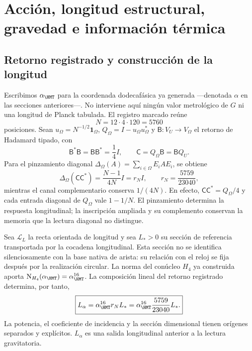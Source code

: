 \section{Acción, longitud estructural, gravedad e información térmica}
\label{v:ant:sec:gravity}

\subsection{Retorno registrado y construcción de la longitud}

Escribimos $\alpha_{\HMT}$ para la coordenada dodecafásica ya generada
---denotada $\alpha$ en las secciones anteriores---. No interviene aquí
ningún valor metrológico de $G$ ni una longitud de Planck tabulada. El
registro marcado reúne
\begin{equation}
 N=12\cdot4\cdot120=5760
 \label{v:eq:cardinal-longitud-alpha}
\end{equation}
posiciones. Sean $u_\Omega=N^{-1/2}\mathbf1_\Omega$,
$Q_\Omega=I-u_\Omega u_\Omega^*$ y
$\mathsf B:V_U\to V_\Omega$ el retorno de Hadamard tipado, con
\begin{equation}
 \mathsf B^*\mathsf B=\mathsf B\mathsf B^*=\frac14I,
 \qquad \mathsf C=Q_\Omega\mathsf B=\mathsf BQ_U.
 \label{v:eq:retorno-hadamard-longitud}
\end{equation}
Para el pinzamiento diagonal
$\Delta_\Omega(A)=\sum_{i\in\Omega}E_iAE_i$, se obtiene
\begin{equation}
 \Delta_\Omega(\mathsf C\mathsf C^*)
 =\frac{N-1}{4N}I=r_NI,
 \qquad
 r_N=\frac{5759}{23040},
 \label{v:eq:residuo-longitud-alpha}
\end{equation}
mientras el canal complementario conserva $1/(4N)$. En efecto,
$\mathsf C\mathsf C^*=Q_\Omega/4$ y cada entrada diagonal de
$Q_\Omega$ vale $1-1/N$. El pinzamiento determina la respuesta
longitudinal; la inscripción ampliada y su complemento conservan la
memoria que la lectura diagonal no distingue.

Sea $\mathcal L_L$ la recta orientada de longitud y sea $L_*>0$ su
sección de referencia transportada por la cocadena longitudinal. Esta
sección no se identifica silenciosamente con la base nativa de arista:
su relación con el reloj se fija después por la realización circular.
La norma del conúcleo $H_4$ ya construida aporta
$\mathrm N_{H_4}(\alpha_{\HMT})=\alpha_{\HMT}^{16}$. La composición
lineal del retorno registrado determina, por tanto,
\begin{equation}
 \boxed{
 L_\alpha=\alpha_{\HMT}^{16}r_NL_*
 =\alpha_{\HMT}^{16}\frac{5759}{23040}L_* .}
 \label{v:eq:longitud-alpha}
\end{equation}
La potencia, el coeficiente de incidencia y la sección dimensional tienen
orígenes separados y explícitos. $L_\alpha$ es una salida longitudinal
anterior a la lectura gravitatoria.

